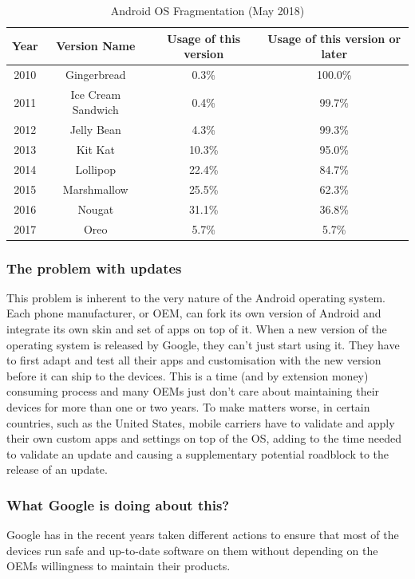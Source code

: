 \documentclass[11pt,a4paper]{report}
\begin{document}
\begin{table}[H]
\centering
\bgroup
\def\arraystretch{1.5}%
\begin{tabular}{|c|c|c|c|}
\hline
  \textbf{Year} & \textbf{Version Name} & \textbf{Usage of this version} & \textbf{Usage of this version or later}\\
  \hline
2010 & Gingerbread & 0.3\% & 100.0\% \\
\hline
2011 & Ice Cream Sandwich & 0.4\% & 99.7\% \\
\hline
2012 & Jelly Bean & 4.3\% & 99.3\% \\
\hline
2013 & Kit Kat & 10.3\% & 95.0\% \\
\hline
2014 & Lollipop & 22.4\% & 84.7\% \\
\hline
2015 & Marshmallow & 25.5\% & 62.3\% \\
\hline
2016 & Nougat & 31.1\% & 36.8\% \\
\hline
2017 & Oreo & 5.7\% & 5.7\% \\
\hline
\end{tabular}
\egroup
\label{android_os_table}
\caption[Android OS Fragmentation]{Android OS Fragmentation (May 2018)\cite{android:dev:osfragmentation}}
\end{table}

\subsubsection{The problem with updates}
This problem is inherent to the very nature of the Android operating system. Each phone manufacturer, or OEM, can fork its own version of Android and integrate its own skin and set of apps on top of it. When a new version of the operating system is released by Google, they can't just start using it. They have to first adapt and test all their apps and customisation with the new version before it can ship to the devices. This is a time (and by extension money) consuming process and many OEMs just don't care about maintaining their devices for more than one or two years. To make matters worse, in certain countries, such as the United States, mobile carriers have to validate and apply their own custom apps and settings on top of the OS, adding to the time needed to validate an update and causing a supplementary potential roadblock to the release of an update.

\subsubsection{What Google is doing about this?}
Google has in the recent years taken different actions to ensure that most of the devices run safe and up-to-date software on them without depending on the OEMs willingness to maintain their products.
\end{document}
